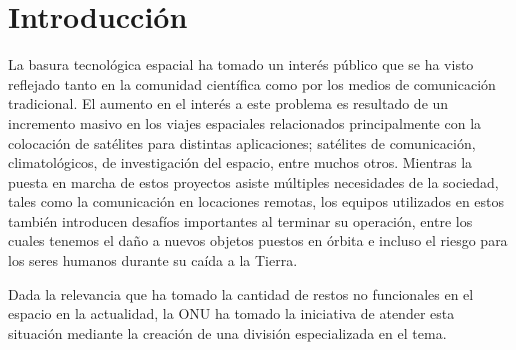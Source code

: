 \section{Introducción}\label{Sec:Introduction}

La basura tecnológica espacial ha tomado un interés público que se ha visto reflejado tanto en la comunidad científica como por los medios de comunicación tradicional. El aumento en el interés a este problema es resultado de un incremento masivo en los viajes espaciales relacionados principalmente con la colocación de satélites para distintas aplicaciones; satélites de comunicación, climatológicos, de investigación del espacio, entre muchos otros. Mientras la puesta en marcha de estos proyectos asiste múltiples necesidades de la sociedad, tales como la comunicación en locaciones remotas, los equipos utilizados en estos también introducen desafíos importantes al terminar su operación, entre los cuales tenemos el daño a nuevos objetos puestos en órbita e incluso el riesgo para los seres humanos durante su caída a la Tierra.

Dada la relevancia que ha tomado la cantidad de restos no funcionales en el espacio en la actualidad, la ONU ha tomado la iniciativa de atender esta situación mediante la creación de una división especializada en el tema.
